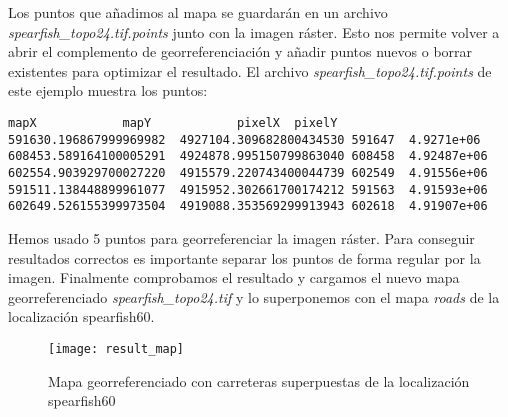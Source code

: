 Los puntos que añadimos al mapa se guardarán en un archivo \textsl{spearfish\_topo24.tif.points} 
junto con la imagen ráster. Esto nos permite volver a abrir el complemento de georreferenciación y añadir 
puntos nuevos o borrar existentes para optimizar el resultado. El archivo \textsl{spearfish\_topo24.tif.points} de este ejemplo muestra los puntos:

\begin{verbatim}
mapX    		mapY    		pixelX  pixelY
591630.196867999969982  4927104.309682800434530 591647  4.9271e+06
608453.589164100005291  4924878.995150799863040 608458  4.92487e+06
602554.903929700027220  4915579.220743400044739 602549  4.91556e+06
591511.138448899961077  4915952.302661700174212 591563  4.91593e+06
602649.526155399973504  4919088.353569299913943 602618  4.91907e+06
\end{verbatim} 

Hemos usado 5 puntos para georreferenciar la imagen ráster. Para conseguir resultados correctos 
es importante separar los puntos de forma regular por la imagen. Finalmente comprobamos el resultado 
y cargamos el nuevo mapa georreferenciado \textsl{spearfish\_topo24.tif} y lo superponemos con el mapa 
 \textsl{roads} de la localización spearfish60.

\begin{figure}[ht]
\begin{center}
  \caption{Mapa georreferenciado con carreteras superpuestas de la localización spearfish60}\label{fig:result_map}\smallskip
  \texttt{[image: result\_map]}
\end{center}
\end{figure}







